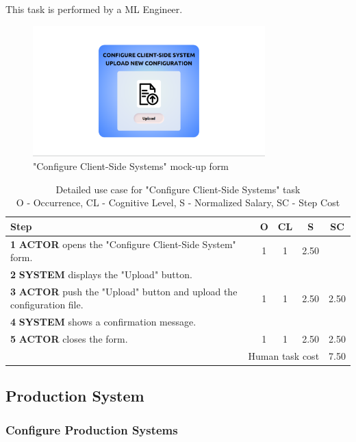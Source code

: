 This task is performed by a ML Engineer.

\begin{figure}[H]
\centering
\includegraphics[width=0.8\textwidth]{figures/ui_configure_client-side.png}
\caption{"Configure Client-Side Systems" mock-up form}
\end{figure}

\begin{table}[H]
\centering
\begin{tabularx}{\textwidth}{|X|c|c|c|c|}
\hline
\textbf{Step} & \textbf{O} & \textbf{CL} & \textbf{S} & \textbf{SC} \\
\hline
\textbf{1} \textbf{ACTOR} opens the "Configure Client-Side System" form. & 1 &1 & 2.50 & \\
\hline
\textbf{2} \textbf{SYSTEM} displays the "Upload" button.& & & & \\
\hline
\textbf{3} \textbf{ACTOR} push the "Upload" button and upload the configuration file. & 1 & 1 & 2.50 & 2.50 \\
\hline
\textbf{4} \textbf{SYSTEM} shows a confirmation message. & & & & \\
\hline
\textbf{5} \textbf{ACTOR} closes the form. & 1 & 1 & 2.50 & 2.50 \\
\hline
\multicolumn{4}{|r|}{Human task cost} & 7.50 \\
\hline
\end{tabularx}
\caption{Detailed use case for "Configure Client-Side Systems" task\\ 
O - Occurrence, CL - Cognitive Level, S - Normalized Salary, SC - Step Cost}
\label{table:configure_client_side}
\end{table}


\subsection{Production System}

\subsubsection{Configure Production Systems}


